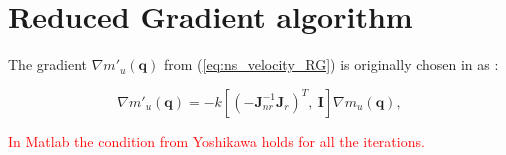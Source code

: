 







 





	
	






 



\section{Reduced Gradient algorithm}
\label{sec:1D2D}


The gradient $\nabla m'_u(\mathbf{q})$  from (\ref{eq:ns_velocity_RG}) is originally  chosen in \cite{reduced_gradient} as : 

\begin{equation}
 \nabla m'_u(\mathbf{q}) = - k \left[(-\mathbf{J}_{nr}^{-1} \mathbf{J}_r)^{T}, \   \mathbf{I} \right ] \nabla m_u(\mathbf{q})
 ,
\label{eq:RG_deLuca}
\end{equation}



\textcolor{red}{In Matlab the condition from Yoshikawa holds for all the iterations.  }\\



